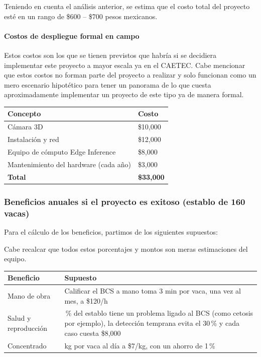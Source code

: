 \medskip
Teniendo en cuenta el análisis anterior, se estima que el costo total del proyecto esté en un rango de \$600 -- \$700 pesos mexicanos.

\paragraph{Costos de despliegue formal en campo}

Estos costos son los que se tienen previstos que habría si se decidiera implementar este proyecto a mayor escala ya en el CAETEC. Cabe mencionar que estos costos no forman parte del proyecto a realizar y solo funcionan como un mero escenario hipotético para tener un panorama de lo que cuesta aproximadamente implementar un proyecto de este tipo ya de manera formal.

\medskip
\noindent
\begin{tabularx}{\textwidth}{>{\raggedright\arraybackslash}X>{\raggedright\arraybackslash}p{}}
  \toprule
  Concepto & Costo \\
  \midrule
  Cámara 3D & \$10,000 \\
  Instalación y red & \$12,000 \\
  Equipo de cómputo Edge Inference & \$8,000 \\
  Mantenimiento del hardware (cada año) & \$3,000 \\
  \midrule
  \textbf{Total} & \textbf{\$33,000} \\
  \bottomrule
\end{tabularx}

\subsubsection{Beneficios anuales si el proyecto es exitoso (establo de 160 vacas)}

Para el cálculo de los beneficios, partimos de los siguientes supuestos:

Cabe recalcar que todos estos porcentajes y montos son meras estimaciones del equipo.

\medskip
\noindent
\begin{tabularx}{\textwidth}{>{\raggedright\arraybackslash}p{}>{\raggedright\arraybackslash}X}
  \toprule
  Beneficio & Supuesto \\
  \midrule
  Mano de obra & Calificar el BCS a mano toma 3 min por vaca, una vez al mes, a \$120/h \\
  \addlinespace
  Salud y reproducción & 5\,\% del establo tiene un problema ligado al BCS (como cetosis por ejemplo), la detección temprana evita el 30\,\% y cada caso cuesta \$8,000 \\
  \addlinespace
  Concentrado & 8 kg por vaca al día a \$7/kg, con un ahorro de 1\,\% \\
  \bottomrule
\end{tabularx}


